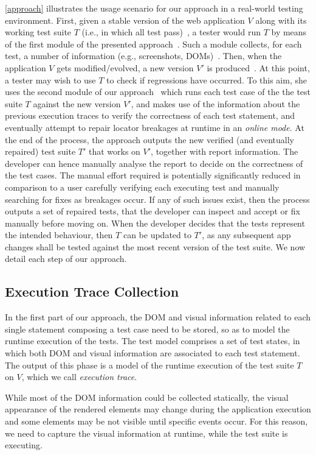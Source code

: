 \autoref{approach} illustrates the usage scenario for our approach in a real-world testing environment. 
First, given a stable version of the web application $V$ along with its working test suite $T$ (i.e., in which all test pass)~, a tester would run $T$ by means of the first module of the presented approach~. Such a module collects, for each test, a number of information (e.g., screenshots, DOMs)~. 
Then, when the application $V$ gets modified/evolved, a new version $V'$ is produced~. At this point, a tester may wish to use $T$ to check if regressions have occurred. To this aim, she uses the second module of our approach~ which runs each test case of the the test suite $T$ against the new version $V'$, and makes use of the information about the previous execution traces to verify the correctness of each test statement, and eventually attempt to repair locator breakages at runtime in an \textit{online mode}. At the end of the process, the approach outputs the new verified (and eventually repaired) test suite $T'$ that works on $V'$, together with report information. 
The developer can hence manually analyse the report to decide on the correctness of the test cases. The manual effort required is potentially significantly reduced in comparison to a user carefully verifying each executing test and manually searching for fixes as breakages occur. If any of such issues exist, then the process outputs a set of repaired tests, that the developer can inspect and accept or fix manually before moving on. When the developer decides that the tests represent the intended behaviour, then $T$ can be updated to $T'$, as any subsequent app changes shall be tested against the most recent version of the test suite.
%
We now detail each step of our approach.

\subsection{Execution Trace Collection}
%
In the first part of our approach, the DOM and visual information related to each single statement composing a test case need to be stored, so as to model the runtime execution of the tests. The test model comprises a set of test states, in which both DOM and visual information are associated to each test statement. The output of this phase is a model of the runtime execution of the test suite $T$ on $V$, which we call \textit{execution trace}.


While most of the DOM information could be collected statically, the visual appearance of the rendered elements may change during the application execution and some elements may be not visible until specific events occur. For this reason, we need to capture the visual information at runtime, while the test suite is executing. 

